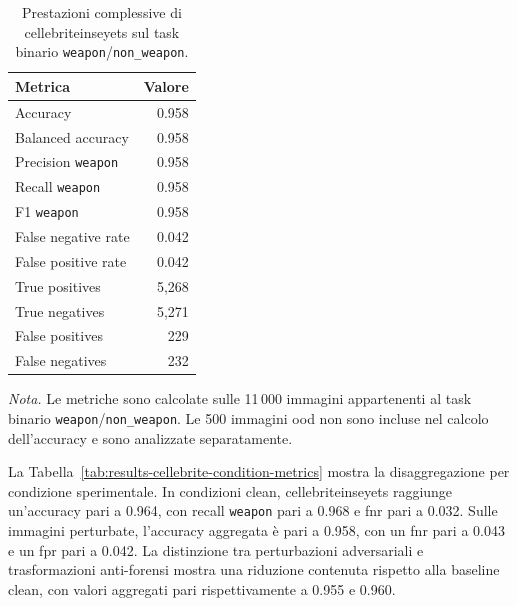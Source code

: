 \begin{table}[H]
\centering
\caption{Prestazioni complessive di \gls{cellebriteinseyets} sul task binario \texttt{weapon}/\texttt{non\_weapon}.}
\label{tab:results-cellebrite-global-metrics}
\small
\begin{tabular}{lr}
\toprule
\textbf{Metrica} & \textbf{Valore} \\
\midrule
Accuracy & 0.958 \\
Balanced accuracy & 0.958 \\
Precision \texttt{weapon} & 0.958 \\
Recall \texttt{weapon} & 0.958 \\
F1 \texttt{weapon} & 0.958 \\
False negative rate & 0.042 \\
False positive rate & 0.042 \\
True positives & 5,268 \\
True negatives & 5,271 \\
False positives & 229 \\
False negatives & 232 \\
\bottomrule
\end{tabular}

\vspace{0.4em}
\footnotesize
\textit{Nota.} Le metriche sono calcolate sulle 11\,000 immagini appartenenti al
task binario \texttt{weapon}/\texttt{non\_weapon}. Le 500 immagini \gls{ood} non
sono incluse nel calcolo dell'accuracy e sono analizzate separatamente.
\end{table}

La Tabella~\ref{tab:results-cellebrite-condition-metrics} mostra la
disaggregazione per condizione sperimentale. In condizioni clean,
\gls{cellebriteinseyets} raggiunge un'accuracy pari a 0.964, con recall
\texttt{weapon} pari a 0.968 e \gls{fnr} pari a 0.032. Sulle immagini perturbate,
l'accuracy aggregata è pari a 0.958, con un \gls{fnr} pari a 0.043 e un
\gls{fpr} pari a 0.042. La distinzione tra perturbazioni adversariali e
trasformazioni anti-forensi mostra una riduzione contenuta rispetto alla baseline
clean, con valori aggregati pari rispettivamente a 0.955 e 0.960.

